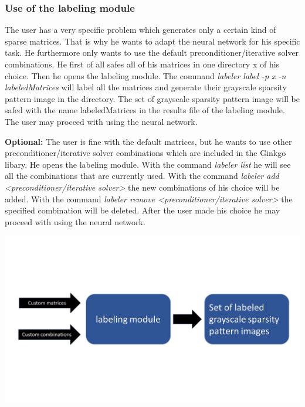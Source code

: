 \documentclass[parskip=full]{scrartcl}
\begin{document}
\subsubsection{Use of the \gls{labeling module}}
The user has a very specific problem which generates only a certain kind of sparse matrices. That is why he wants to adapt the \gls{neural network} for his specific task. He furthermore only wants to use the default \gls{preconditioner}/\gls{iterative solver} combinations. He first of all safes all of his matrices in one directory x of his choice. Then he opens the \gls{labeling module}. The command \textit{labeler label -p x -n labeledMatrices} will label all the matrices and generate their \gls{grayscale sparsity pattern image} in the directory. The set of \gls{grayscale sparsity pattern image} will be safed with the name labeledMatrices in the results file of the \gls{labeling module}. The user may proceed with using the \gls{neural network}.


\textbf{Optional:} The user is fine with the default matrices, but he wants to use other \gls{preconditioner}/\gls{iterative solver} combinations which are included in the \gls{Ginkgo} libary. He opens the \gls{labeling module}. With the command \textit{labeler list} he will see all the combinations that are currently used. With the command \textit{labeler add <\gls{preconditioner}/\gls{iterative solver}>} the new combinations of his choice will be added. With the command \textit{labeler remove <\gls{preconditioner}/\gls{iterative solver}>} the specified combination will be deleted. After the user made his choice he may proceed with using the \gls{neural network}.
\begin{center}
\includegraphics[width=\textwidth]{labelingModule}
\end{center}
\end{document}

